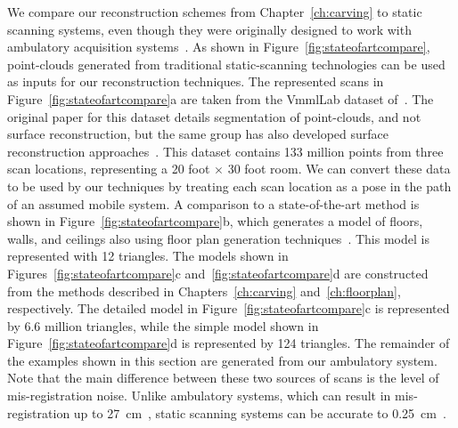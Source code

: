 \documentclass[12pt,onecolumn,oneside]{book}
\begin{document}
We compare our reconstruction schemes from Chapter~\ref{ch:carving} to static scanning systems, even though they were originally designed to work with ambulatory acquisition systems~\cite{Backpack}.  As shown in Figure~\ref{fig:stateofartcompare}, point-clouds generated from traditional static-scanning technologies can be used as inputs for our reconstruction techniques. The represented scans in Figure~\ref{fig:stateofartcompare}a are taken from the VmmlLab dataset of~\cite{Mattausch14}.  The original paper for this dataset details segmentation of point-clouds, and not surface reconstruction, but the same group has also developed surface reconstruction approaches~\cite{Mura13,Mura14}. This dataset contains 133 million points from three scan locations, representing a 20 foot $\times$ 30 foot room.  We can convert these data to be used by our techniques by treating each scan location as a pose in the path of an assumed mobile system.  A comparison to a state-of-the-art method is shown in Figure~\ref{fig:stateofartcompare}b, which generates a model of floors, walls, and ceilings also using floor plan generation techniques~\cite{Mura13}.  This model is represented with 12 triangles.  The models shown in Figures~\ref{fig:stateofartcompare}c and~\ref{fig:stateofartcompare}d are constructed from the methods described in Chapters~\ref{ch:carving} and~\ref{ch:floorplan}, respectively.  The detailed model in Figure~\ref{fig:stateofartcompare}c is represented by 6.6 million triangles, while the simple model shown in Figure~\ref{fig:stateofartcompare}d is represented by 124 triangles.  The remainder of the examples shown in this section are generated from our ambulatory system.  Note that the main difference between these two sources of scans is the level of mis-registration noise. Unlike ambulatory systems, which can result in mis-registration up to 27~cm~\cite{NickJournal}, static scanning systems can be accurate to 0.25~cm~\cite{Mura13}.
\end{document}
